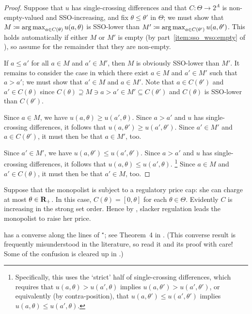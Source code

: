 \begin{proof}
	Suppose that $u$ has single-crossing differences and that $C : \Theta \to 2^A$ is non-empty-valued and SSO-increasing, and fix $\theta \leq \theta'$ in $\Theta$; we must show that $M \coloneqq \operatorname*{arg\,max}_{a \in C(\theta)} u(a,\theta)$ is SSO-lower than $M' \coloneqq \operatorname*{arg\,max}_{a \in C(\theta')} u(a,\theta')$. This holds automatically if either $M$ or $M'$ is empty (by part~\ref{item:sso_wso:empty} of ), so assume for the remainder that they are non-empty.

	If $a \leq a'$ for all $a \in M$ and $a' \in M'$, then $M$ is obviously SSO-lower than $M'$. It remains to consider the case in which there exist $a \in M$ and $a' \in M'$ such that $a > a'$; we must show that $a' \in M$ and $a \in M'$. Note that $a \in C(\theta')$ and $a' \in C(\theta)$ since $C(\theta) \supseteq M \ni a > a' \in M' \subseteq C(\theta')$ and $C(\theta)$ is SSO-lower than $C(\theta')$.

	Since $a \in M$, we have $u(a,\theta) \geq u(a',\theta)$. Since $a > a'$ and $u$ has single-crossing differences, it follows that $u(a,\theta') \geq u(a',\theta')$. Since $a' \in M'$ and $a \in C(\theta')$, it must then be that $a \in M'$, too.

	Since $a' \in M'$, we have $u(a,\theta') \leq u(a',\theta')$. Since $a > a'$ and $u$ has single-crossing differences, it follows that $u(a,\theta) \leq u(a',\theta)$.%
		\footnote{Specifically, this uses the `strict' half of single-crossing differences, which requires that $u(a,\theta) > u(a',\theta)$ implies $u(a,\theta') > u(a',\theta')$, or equivalently (by contra-position), that $u(a,\theta') \leq u(a',\theta')$ implies $u(a,\theta) \leq u(a',\theta)$.}
	Since $a \in M$ and $a' \in C(\theta)$, it must then be that $a' \in M$, too.
\end{proof}

\begin{namedthm}[\Cref*{example:monopoly} {\normalfont (continued)}.]
	\label{example:monopoly_consr}
	Suppose that the monopolist is subject to a regulatory price cap: she can charge at most $\theta \in \mathbf{R}_+$. In this case, $C(\theta) = [0,\theta]$ for each $\theta \in \Theta$. Evidently $C$ is increasing in the strong set order. Hence by , slacker regulation leads the monopolist to raise her price.
\end{namedthm}

 has a converse along the lines of \hyperref[theorem:topkis_ms_converse]{$^\star$}; see Theorem~4 in \textcite{MilgromShannon1994}. (This converse result is frequently misunderstood in the literature, so read it and its proof with care! Some of the confusion is cleared up in \textcite{AmirRietzke2025}.)

